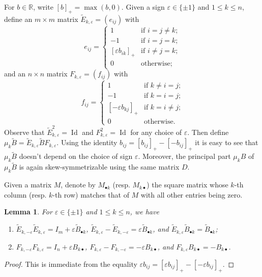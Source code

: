 \documentclass{amsart}
\newtheorem{lemma}[theorem]{Lemma}
\numberwithin{theorem}{section}
\newcommand{\bfb}{\boldsymbol{b}}
\newcommand{\RR}{\mathbb{R}}
\newcommand{\Id}{\operatorname{Id}}
\begin{document}
  For $b\in\RR$, write $[b]_+=\max(b,0)$.
  Given a sign $\varepsilon\in\{\pm1\}$ and $1\le k\le n$, define an $m\times m$ matrix $\tilde E_{k,\varepsilon}=(e_{ij})$ with
  \begin{equation}
    \label{eq:left mutation matrix}
    e_{ij}=\begin{cases} 1 & \text{if $i=j\ne k$;}\\ -1 & \text{if $i=j=k$;}\\ [\varepsilon b_{ik}]_+ & \text{if $i\ne j=k$;}\\ 0 & \text{otherwise;} \end{cases}
  \end{equation}
  and an $n\times n$ matrix $F_{k,\varepsilon}=(f_{ij})$ with
  \begin{equation}
    \label{eq:right mutation matrix}
    f_{ij}=\begin{cases} 1 & \text{if $k\ne i=j$;}\\ -1 & \text{if $k=i=j$;}\\ [-\varepsilon b_{kj}]_+ & \text{if $k=i\ne j$;}\\ 0 & \text{otherwise.} \end{cases}
  \end{equation}
  Observe that $\tilde E^2_{k,\varepsilon}=\Id$ and $F^2_{k,\varepsilon}=\Id$ for any choice of $\varepsilon$.
  Then define $\mu_k\tilde B=\tilde E_{k,\varepsilon} \tilde B F_{k,\varepsilon}$.
  Using the identity $b_{ij}=[b_{ij}]_+-[-b_{ij}]_+$ it is easy to see that $\mu_k\tilde B$ doesn't depend on the choice of sign $\varepsilon$.
  Moreover, the principal part $\mu_k B$ of $\mu_k\tilde B$ is again skew-symmetrizable using the same matrix $D$.

  Given a matrix $M$, denote by $M_{\bullet k}$ (resp. $M_{k \bullet}$) the square matrix whose $k$-th column (resp. $k$-th row) matches that of $M$ with all other entries being zero.
  \begin{lemma}
    For $\varepsilon\in\{\pm1\}$ and $1\le k \le n$, we have 
    \begin{enumerate}
      \item $\tilde E_{k,-\varepsilon} \tilde E_{k,\varepsilon} = I_m + \varepsilon \tilde B_{\bullet k}$, $\tilde E_{k,\varepsilon} - \tilde E_{k,-\varepsilon} = \varepsilon \tilde B_{\bullet k}$, and $\tilde E_{k,\varepsilon} \tilde B_{\bullet k} = \tilde B_{\bullet k}$;
      \item $F_{k,-\varepsilon} F_{k,\varepsilon} = I_n + \varepsilon B_{k \bullet}$, $F_{k,\varepsilon} - F_{k,-\varepsilon} = -\varepsilon B_{k \bullet}$, and $F_{k,\varepsilon} B_{k \bullet} = -B_{k \bullet}$.
    \end{enumerate}
  \end{lemma}
  \begin{proof}
    This is immediate from the equality $\varepsilon b_{ij}=[\varepsilon b_{ij}]_+-[-\varepsilon b_{ij}]_+$.
  \end{proof}
\end{document}
